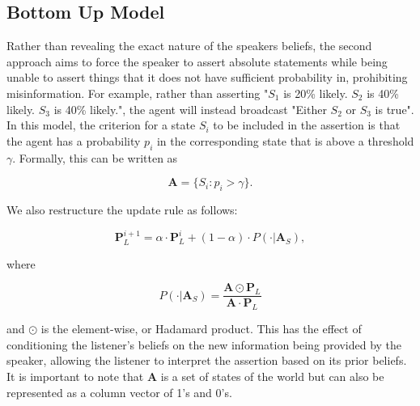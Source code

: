 \subsection{Bottom Up Model}

Rather than revealing the exact nature of the speakers beliefs, the second approach aims to force the speaker to assert absolute statements while being unable to assert things that it does not have sufficient probability in, prohibiting misinformation. For example, rather than asserting "$S_1$ is 20\% likely. $S_2$ is 40\% likely. $S_3$ is 40\% likely.", the agent will instead broadcast "Either $S_2$ or $S_3$ is true". In this model, the criterion for a state $S_i$ to be included in the assertion is that the agent has a probability $p_i$ in the corresponding state that is above a threshold $\gamma$. Formally, this can be written as 

\begin{equation}\label{eq:BU_approach}
    \mathbf{A} = \{  S_i : p_i > \gamma\}. 
\end{equation}

We also restructure the update rule as follows:

\begin{equation} \label{eq:BU_update_rule}
    \mathbf{P}^{i+1}_L = \alpha \cdot \mathbf{P}^{i}_L + (1 - \alpha) \cdot P(\cdot | \mathbf{A}_S),
\end{equation}

where

\begin{equation}\label{eq:condition_on_p}
     P(\mathbf{\cdot} | \mathbf{A}_S) = \frac{\mathbf{A} \odot \mathbf{P}_L}{\mathbf{A} \cdot \mathbf{P}_L}
\end{equation}

and $\odot$ is the element-wise, or Hadamard product. This has the effect of conditioning the listener's beliefs on the new information being provided by the speaker, allowing the listener to interpret the assertion based on its prior beliefs. It is important to note that $\mathbf{A}$ is a set of states of the world but can also be represented as a column vector of 1's and 0's. 
